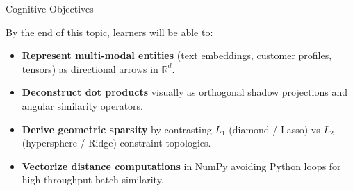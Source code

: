 \documentclass[../m00-session-02.tex]{subfiles}
\begin{document}

\begin{frame}{Cognitive Objectives}
  \begin{LearningObjectives}{By the end of this topic, learners will be able to:}
    \begin{itemize}\setlength{\itemsep}{0.28em}
      \item \textbf{Represent multi-modal entities} (text embeddings, customer profiles, tensors) as directional arrows in $\mathbb{R}^d$.
      \item \textbf{Deconstruct dot products} visually as orthogonal shadow projections and angular similarity operators.
      \item \textbf{Derive geometric sparsity} by contrasting $L_1$ (diamond / Lasso) vs $L_2$ (hypersphere / Ridge) constraint topologies.
      \item \textbf{Vectorize distance computations} in NumPy avoiding Python loops for high-throughput batch similarity.
    \end{itemize}
  \end{LearningObjectives}
\end{frame}
\end{document}
